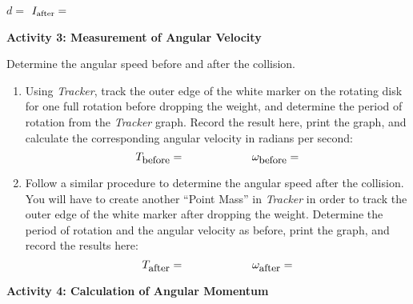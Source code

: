 $d=$ \hfill{} $I_{\rm after} =$ \hfill{}  
\answerspace{5mm}


\textbf{Activity 3: Measurement of Angular Velocity}

Determine the angular speed before and after the collision.

\begin{enumerate}
\item Using \textit{Tracker}, track the outer edge of the white marker on the rotating disk 
for one full rotation before dropping the weight, and determine the period of rotation from the 
\textit{Tracker} graph. Record the result here, print the graph, and calculate the corresponding angular velocity 
in radians per second:
\[
T_{\mbox{\small before}}=\qquad \qquad \qquad \omega _{\mbox{\small before}}=\]
\vspace{5mm}
\item Follow a similar procedure to determine the angular speed after the collision. You will have 
to create another ``Point Mass'' in \textit{Tracker} in order to track the outer edge of the white 
marker after dropping the weight. Determine the period of rotation and the angular velocity as 
before, print the graph, and record the results here:
\[
T_{\mbox{\small after}}=\qquad \qquad \qquad \omega _{\mbox{\small after}}=\]

\end{enumerate}
\answerspace{10mm}
\pagebreak[2]
\textbf{Activity 4: Calculation of Angular Momentum}

